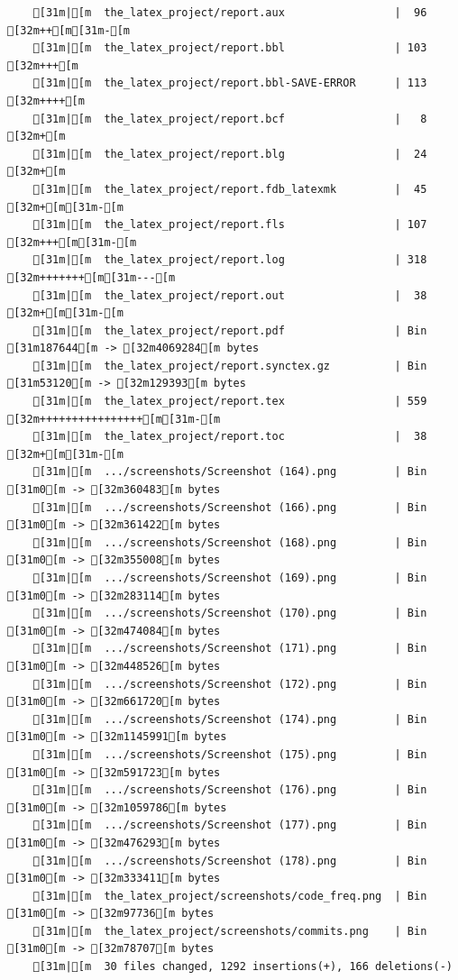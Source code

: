 \documentclass{article}
\begin{document}
{\begin{verbatim}
    [31m|[m  the_latex_project/report.aux                 |  96 [32m++[m[31m-[m
    [31m|[m  the_latex_project/report.bbl                 | 103 [32m+++[m
    [31m|[m  the_latex_project/report.bbl-SAVE-ERROR      | 113 [32m++++[m
    [31m|[m  the_latex_project/report.bcf                 |   8 [32m+[m
    [31m|[m  the_latex_project/report.blg                 |  24 [32m+[m
    [31m|[m  the_latex_project/report.fdb_latexmk         |  45 [32m+[m[31m-[m
    [31m|[m  the_latex_project/report.fls                 | 107 [32m+++[m[31m-[m
    [31m|[m  the_latex_project/report.log                 | 318 [32m+++++++[m[31m---[m
    [31m|[m  the_latex_project/report.out                 |  38 [32m+[m[31m-[m
    [31m|[m  the_latex_project/report.pdf                 | Bin [31m187644[m -> [32m4069284[m bytes
    [31m|[m  the_latex_project/report.synctex.gz          | Bin [31m53120[m -> [32m129393[m bytes
    [31m|[m  the_latex_project/report.tex                 | 559 [32m++++++++++++++++[m[31m-[m
    [31m|[m  the_latex_project/report.toc                 |  38 [32m+[m[31m-[m
    [31m|[m  .../screenshots/Screenshot (164).png         | Bin [31m0[m -> [32m360483[m bytes
    [31m|[m  .../screenshots/Screenshot (166).png         | Bin [31m0[m -> [32m361422[m bytes
    [31m|[m  .../screenshots/Screenshot (168).png         | Bin [31m0[m -> [32m355008[m bytes
    [31m|[m  .../screenshots/Screenshot (169).png         | Bin [31m0[m -> [32m283114[m bytes
    [31m|[m  .../screenshots/Screenshot (170).png         | Bin [31m0[m -> [32m474084[m bytes
    [31m|[m  .../screenshots/Screenshot (171).png         | Bin [31m0[m -> [32m448526[m bytes
    [31m|[m  .../screenshots/Screenshot (172).png         | Bin [31m0[m -> [32m661720[m bytes
    [31m|[m  .../screenshots/Screenshot (174).png         | Bin [31m0[m -> [32m1145991[m bytes
    [31m|[m  .../screenshots/Screenshot (175).png         | Bin [31m0[m -> [32m591723[m bytes
    [31m|[m  .../screenshots/Screenshot (176).png         | Bin [31m0[m -> [32m1059786[m bytes
    [31m|[m  .../screenshots/Screenshot (177).png         | Bin [31m0[m -> [32m476293[m bytes
    [31m|[m  .../screenshots/Screenshot (178).png         | Bin [31m0[m -> [32m333411[m bytes
    [31m|[m  the_latex_project/screenshots/code_freq.png  | Bin [31m0[m -> [32m97736[m bytes
    [31m|[m  the_latex_project/screenshots/commits.png    | Bin [31m0[m -> [32m78707[m bytes
    [31m|[m  30 files changed, 1292 insertions(+), 166 deletions(-)

\end{verbatim}}
\end{document}
